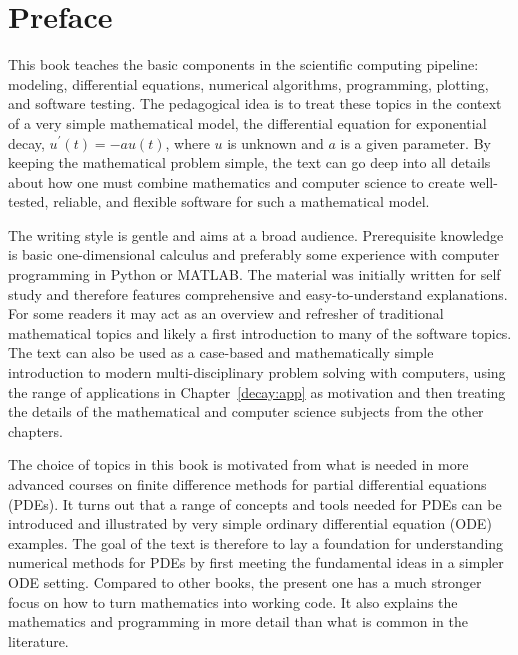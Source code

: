 \documentclass[graybox,sectrefs,envcountresetchap,open=right,final]{svmonodo}
\begin{document}
\mymainmatter

\chapter*{Preface}
\label{ch:preface}


This book teaches the basic components in the scientific
computing pipeline: modeling, differential equations, numerical
algorithms, programming, plotting, and software testing. The pedagogical idea
is to treat these topics in the context of a very simple
mathematical model, the
differential equation for exponential decay, $u^{\prime}(t)=-au(t)$,
where $u$ is unknown and $a$ is a given parameter. By keeping the
mathematical problem simple, the text can go deep into all details
about how one must combine mathematics and computer science to
create well-tested, reliable, and flexible software for such a
mathematical model.

The writing style is gentle and aims at a broad audience.
Prerequisite knowledge is basic one-dimensional calculus and preferably
some experience with computer programming in Python or MATLAB.
The material was initially written for self study and therefore features
comprehensive and easy-to-understand explanations. For
some readers it may act as an overview and refresher of traditional
mathematical topics and likely a first introduction to many of the
software topics. The text can also be used
as a case-based and mathematically simple introduction to modern
multi-disciplinary problem solving with computers, using the
range of applications in Chapter~\ref{decay:app}
as motivation and then treating the details of
the mathematical and computer science subjects from the other
chapters.

The choice of topics in this book is motivated from what is needed in
more advanced courses on finite difference methods for partial
differential equations (PDEs).  It turns out that a range of concepts
and tools needed for PDEs can be introduced and illustrated by very
simple ordinary differential equation (ODE) examples. The goal of the
text is therefore to lay a foundation for understanding numerical
methods for PDEs by first meeting the fundamental ideas in a simpler
ODE setting. Compared to other books, the present one has a much
stronger focus on how to turn mathematics into working code.
It also explains the mathematics and programming in more detail
than what is common in the literature.
\end{document}
